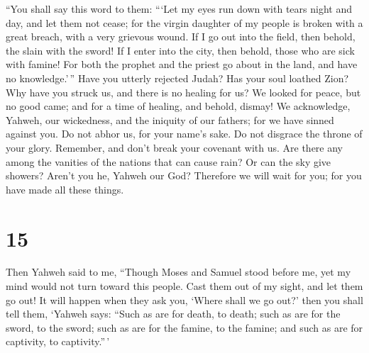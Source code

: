  ``You shall say this word to them: ```Let my eyes run
down with tears night and day, and let them not cease; for the virgin
daughter of my people is broken with a great breach, with a very
grievous wound.  If I go out into the field, then behold,
the slain with the sword! If I enter into the city, then behold, those
who are sick with famine! For both the prophet and the priest go about
in the land, and have no knowledge.'\,''  Have you
utterly rejected Judah? Has your soul loathed Zion? Why have you struck
us, and there is no healing for us? We looked for peace, but no good
came; and for a time of healing, and behold, dismay!  We
acknowledge, Yahweh, our wickedness, and the iniquity of our fathers;
for we have sinned against you.  Do not abhor us, for
your name's sake. Do not disgrace the throne of your glory. Remember,
and don't break your covenant with us.  Are there any
among the vanities of the nations that can cause rain? Or can the sky
give showers? Aren't you he, Yahweh our God? Therefore we will wait for
you; for you have made all these things.

\hypertarget{section-14}{%
\section{15}\label{section-14}}

 Then Yahweh said to me, ``Though Moses and Samuel stood
before me, yet my mind would not turn toward this people. Cast them out
of my sight, and let them go out!  It will happen when
they ask you, `Where shall we go out?' then you shall tell them, `Yahweh
says: ``Such as are for death, to death; such as are for the sword, to
the sword; such as are for the famine, to the famine; and such as are
for captivity, to captivity.''\,'

